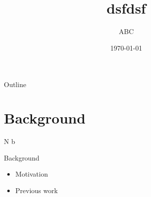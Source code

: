 \documentclass[notes]{beamer}       %
\title{dsfdsf}
\author{ABC}
\date{\today}
\begin{document}
\begin{frame}
  \titlepage
\end{frame}

\begin{frame}{Outline}
 \tableofcontents
\end{frame}

\section{Background}
N b 
\begin{frame}{Background}


\begin{itemize}
  \item Motivation
  \item Previous work


\end{itemize}

\end{frame}
\end{document}
